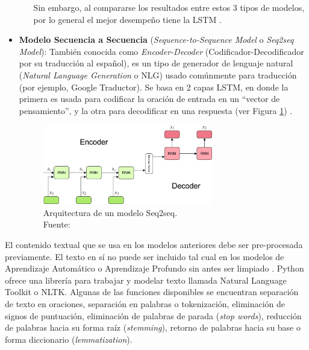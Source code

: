 \begin{itemize}
\begin{itemize}
		Sin embargo, al compararse los resultados entre estos 3 tipos de modelos, por lo general el mejor desempeño tiene la LSTM \parencite{bk_brownlee2017deeplearning_nlp}.
	\end{itemize}
	
	\item \textbf{Modelo Secuencia a Secuencia} (\textit{Sequence-to-Sequence Model} o \textit{Seq2seq Model}): También conocida como \textit{Encoder-Decoder} (Codificador-Decodificador por su traducción al español), es un tipo de generador de lenguaje natural (\textit{Natural Language Generation} o NLG) usado comúnmente para traducción (por ejemplo, Google Traductor). Se basa en 2 capas LSTM, en donde la primera es usada para codificar la oración de entrada en un “vector de pensamiento”, y la otra para decodificar en una respuesta (ver Figura \ref{2:fig45}) \parencite{bk_deng2018deeplearningnlp}.
	
	\begin{figure}[!ht]
		\begin{center}
			\includegraphics[width=0.7\textwidth]{2/figures/encoder-decoder.jpeg}
			\caption[Arquitectura de un modelo Seq2seq]{Arquitectura de un modelo Seq2seq.\\
			Fuente: \cite{tec_kostadinov2019seq2seq}}
			\label{2:fig45}
		\end{center}
	\end{figure}	
\end{itemize}

El contenido textual que se usa en los modelos anteriores debe ser pre-procesada previamente. El texto en sí no puede ser incluido tal cual en los modelos de Aprendizaje Automático o Aprendizaje Profundo sin antes ser limpiado \parencite{bk_brownlee2017deeplearning_nlp}. Python ofrece una librería para trabajar y modelar texto llamada Natural Language Toolkit o NLTK. Algunas de las funciones disponibles se encuentran separación de texto en oraciones, separación en palabras o tokenización, eliminación de signos de puntuación, eliminación de palabras de parada (\textit{stop words}), reducción de palabras hacia su forma raíz (\textit{stemming}), retorno de palabras hacia su base o forma diccionario (\textit{lemmatization}).

